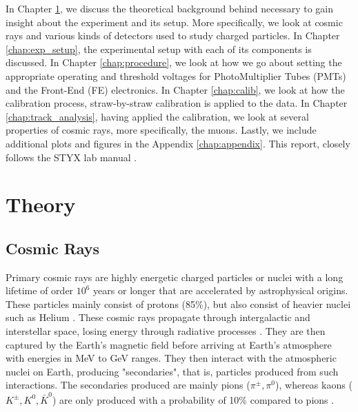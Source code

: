 \documentclass[a4paper]{report}
\numberwithin{equation}{section}
\begin{document}
In Chapter \ref{chap:theory}, we discuss the theoretical background behind necessary to gain insight about the experiment and its setup. More specifically, we look at cosmic rays and various kinds of detectors used to study charged particles. In Chapter \ref{chap:exp_setup}, the experimental setup with each of its components is discussed. In Chapter \ref{chap:procedure}, we look at how we go about setting the appropriate operating and threshold voltages for PhotoMultiplier Tubes (PMTs) and the Front-End (FE) electronics. In Chapter \ref{chap:calib}, we look at how the calibration process, straw-by-straw calibration is applied to the data. In Chapter \ref{chap:track_analysis}, having applied the calibration, we look at several properties of cosmic rays, more specifically, the muons. Lastly, we include additional plots and figures in the Appendix \ref{chap:appendix}. This report, closely follows the STYX lab manual \cite{labman}.

\chapter{Theory} \label{chap:theory}

\section{Cosmic Rays}



Primary cosmic rays are highly energetic charged particles or nuclei with a long lifetime of order $10^6$ years or longer that are accelerated by 
astrophysical origins. These particles mainly consist of protons (85\%), but also consist of heavier nuclei such as Helium \cite{Tanabashi2018}. 
These cosmic rays propagate through intergalactic and interstellar space, losing energy through radiative processes \cite{DeDomenico2012}.
They are then captured by the Earth's magnetic field before arriving at Earth's atmosphere with energies in MeV to GeV ranges. 
They then interact with the atmospheric nuclei on Earth, producing "secondaries", that is, particles produced from such interactions. The secondaries
produced are mainly pions ($\pi^\pm, \pi^0$), whereas kaons ($K^\pm, K^0, \bar{K}^0$) are only produced with a probability of 10\% compared to pions \cite{Grupen2005}. \par 
\end{document}
